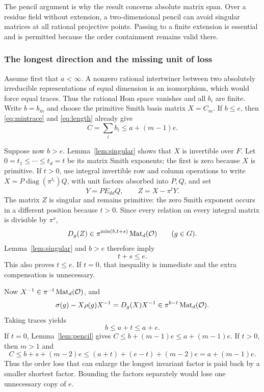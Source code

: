 The pencil argument is why the result concerns absolute matrix span.
Over a residue field without extension, a two-dimensional pencil can
avoid singular matrices at all rational projective points. Passing to a
finite extension is essential and is permitted because the order
containment remains valid there.

\subsubsection{The longest direction and the missing unit of loss}

Assume first that $a<\infty$. A nonzero rational intertwiner between
two absolutely irreducible representations of equal dimension is an
isomorphism, which would force equal traces. Thus the rational Hom space
vanishes and all $b_i$ are finite. Write $b=b_m$ and choose the primitive
Smith basis matrix $X=C_m$. If $b\le e$, then \eqref{eq:mintrace} and
\eqref{eq:length} already give
\[
 C=\sum_i b_i\le a+(m-1)e.
\]

Suppose now $b>e$. Lemma~\ref{lem:singular} shows that $X$ is invertible
over $F$. Let
$0=t_1\le\cdots\le t_d=t$ be its matrix Smith exponents; the first is
zero because $X$ is primitive. If $t>0$, use integral invertible row and
column operations to write $X=P\operatorname{diag}(\pi^{t_i})Q$, with
unit factors absorbed into $P,Q$, and set
\[
 Y=P E_{dd}Q,\qquad Z=X-\pi^tY.
\]
The matrix $Z$ is singular and remains primitive: the zero Smith exponent
occurs in a different position because $t>0$. Since every relation on
every integral matrix is divisible by $\pi^s$,
\[
 D_g(Z)\in\pi^{\min(b,t+s)}\operatorname{Mat}_d(\mathcal O)\qquad(g\in G).
\]
Lemma~\ref{lem:singular} and $b>e$ therefore imply
\begin{equation}\label{eq:compensation}
 t+s\le e.
\end{equation}
This also proves $t\le e$. If $t=0$, that inequality is immediate and
the extra compensation is unnecessary.

Now $X^{-1}\in\pi^{-t}\operatorname{Mat}_d(\mathcal O)$, and
\[
 \sigma(g)-X\rho(g)X^{-1}=D_g(X)X^{-1}
 \in\pi^{b-t}\operatorname{Mat}_d(\mathcal O).
\]
Taking traces yields
\begin{equation}\label{eq:trace-long}
 b\le a+t\le a+e.
\end{equation}
If $t=0$, Lemma~\ref{lem:pencil} gives
$C\le b+(m-1)e\le a+(m-1)e$.
If $t>0$, then $m>1$ and
\[
 C\le b+s+(m-2)e
 \le (a+t)+(e-t)+(m-2)e
 =a+(m-1)e.
\]
Thus the order loss that can enlarge the longest invariant factor is
paid back by a smaller shortest factor. Bounding the factors separately
would lose one unnecessary copy of $e$.

